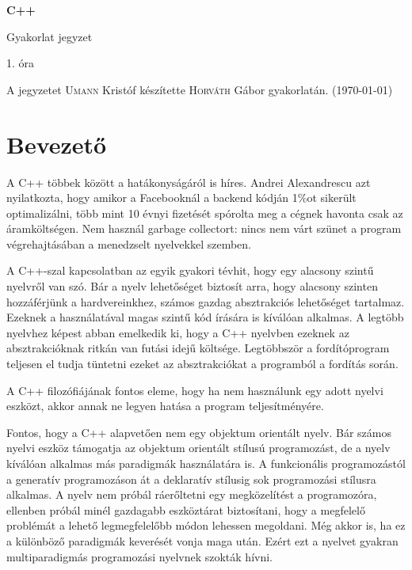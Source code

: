 \documentclass[a4paper,11.5pt,table]{article}
\begin{document}
	\setlength\parindent{0pt}
	\def\<{<\hspace{0mm}<}
	
	\theoremstyle{definition}
	\newtheorem{note}{Megjegyzés}[subsection]
	
	\begin{center}
		{\LARGE\textbf{C++}}
		
		{\Large Gyakorlat jegyzet}
		
		1. óra
	\end{center}
	A jegyzetet \textsc{Umann} Kristóf készítette \textsc{Horváth} Gábor gyakorlatán. (\today)
	\section{Bevezető}
	A C++ többek között a hatákonyságáról is híres. Andrei Alexandrescu azt nyilatkozta, hogy amikor a Facebooknál a backend kódján 1\%ot sikerült optimalizálni, több mint 10 évnyi fizetését spórolta meg a cégnek havonta csak az áramköltségen. Nem használ garbage collectort: nincs nem várt szünet a program végrehajtásában a menedzselt nyelvekkel szemben.

  A C++-szal kapcsolatban az egyik gyakori tévhit, hogy egy alacsony szintű nyelvről van szó. Bár a nyelv lehetőséget biztosít arra, hogy alacsony szinten hozzáférjünk a hardvereinkhez, számos gazdag absztrakciós lehetőséget tartalmaz. Ezeknek a használatával magas szintű kód írására is kíválóan alkalmas. A legtöbb nyelvhez képest abban emelkedik ki, hogy a C++ nyelvben ezeknek az absztrakcióknak ritkán van futási idejű költsége. Legtöbbször a fordítóprogram teljesen el tudja tüntetni ezeket az absztrakciókat a programból a fordítás során.

  A C++ filozófiájának fontos eleme, hogy ha nem használunk egy adott nyelvi eszközt, akkor annak ne legyen hatása a program teljesítményére.

  Fontos, hogy a C++ alapvetően nem egy objektum orientált nyelv. Bár számos nyelvi eszköz támogatja az objektum orientált stílusú programozást, de a nyelv kíválóan alkalmas más paradigmák használatára is. A funkcionális programozástól a generatív programozáson át a deklaratív stílusig sok programozási stílusra alkalmas. A nyelv nem próbál ráerőltetni egy megközelítést a programozóra, ellenben próbál minél gazdagabb eszköztárat biztosítani, hogy a megfelelő problémát a lehető legmegfelelőbb módon lehessen megoldani. Még akkor is, ha ez a különböző paradigmák keverését vonja maga után. Ezért ezt a nyelvet gyakran multiparadigmás programozási nyelvnek szokták hívni. 
	
\end{document}
